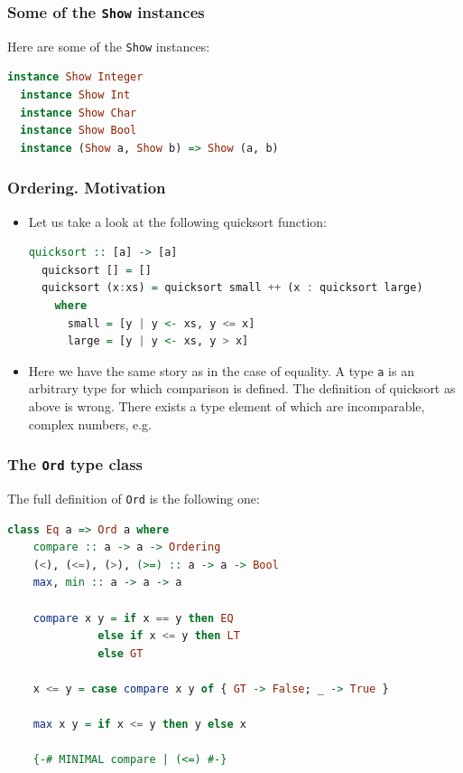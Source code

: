 \documentclass[10pt,pdf,utf8,russian,aspectratio=169]{beamer}
\begin{document}
\begin{frame}[fragile]
  \frametitle{Some of the \verb"Show" instances}

Here are some of the \verb"Show" instances:
\begin{lstlisting}[language=Haskell]
  instance Show Integer
  instance Show Int
  instance Show Char
  instance Show Bool
  instance (Show a, Show b) => Show (a, b)
\end{lstlisting}
\end{frame}

\begin{frame}[fragile]
  \frametitle{Ordering. Motivation}
  \begin{itemize}
  \item Let us take a look at the following quicksort function:

  \begin{lstlisting}[language=Haskell]
  quicksort :: [a] -> [a]
  quicksort [] = []
  quicksort (x:xs) = quicksort small ++ (x : quicksort large)
    where
      small = [y | y <- xs, y <= x]
      large = [y | y <- xs, y > x]
  \end{lstlisting}
  \item Here we have the same story as in the case of equality. A type \verb"a" is an arbitrary type for which comparison is defined. The definition of quicksort as above is wrong. There exists a type element of which are incomparable, complex numbers, e.g.
\end{itemize}
\end{frame}

\begin{frame}[fragile]
  \frametitle{The \verb"Ord" type class}

The full definition of \verb"Ord" is the following one:

  \begin{lstlisting}[language=Haskell]
  class Eq a => Ord a where
    compare :: a -> a -> Ordering
    (<), (<=), (>), (>=) :: a -> a -> Bool
    max, min :: a -> a -> a

    compare x y = if x == y then EQ
              else if x <= y then LT
              else GT

    x <= y = case compare x y of { GT -> False; _ -> True }

    max x y = if x <= y then y else x

    {-# MINIMAL compare | (<=) #-}
  \end{lstlisting}
\end{frame}
\end{document}
